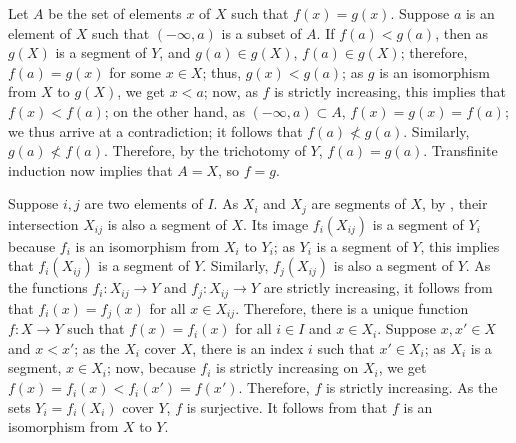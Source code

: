 \documentclass{article}
\begin{document}
\begin{solution}[\ref{exe:owfnmkbo}]
  \label{sol:wcch8wta}
  Let \(A\) be the set of elements \(x\) of \(X\) such that
  \(f(x) = g(x)\).  Suppose \(a\) is an element of \(X\) such that
  \((-\infty, a)\) is a subset of \(A\).  If \(f(a) < g(a)\), then as
  \(g(X)\) is a segment of \(Y\), and \(g(a) \in g(X)\),
  \(f(a) \in g(X)\); therefore, \(f(a) = g(x)\) for some \(x \in X\);
  thus, \(g(x) < g(a)\); as \(g\) is an isomorphism from \(X\) to
  \(g(X)\), we get \(x < a\); now, as \(f\) is strictly increasing,
  this implies that \(f(x) < f(a)\); on the other hand, as
  \((-\infty, a) \subset A\), \(f(x) = g(x) = f(a)\); we thus arrive
  at a contradiction; it follows that \(f(a) \nless g(a)\).
  Similarly, \(g(a) \nless f(a)\).  Therefore, by the trichotomy of
  \(Y\), \(f(a) = g(a)\).  Transfinite induction 
  now implies that \(A = X\), so \(f = g\).
\end{solution}

\begin{solution}[\ref{exe:mybmksm1}]
  \label{sol:yxq37p1c}
  Suppose \(i,j\) are two elements of \(I\).  As \(X_i\) and \(X_j\)
  are segments of \(X\), by , their intersection
  \(X_{ij}\) is also a segment of \(X\).  Its image \(f_i(X_{ij})\) is
  a segment of \(Y_i\) because \(f_i\) is an isomorphism from \(X_i\)
  to \(Y_i\); as \(Y_i\) is a segment of \(Y\), this implies that
  \(f_i(X_{ij})\) is a segment of \(Y\).  Similarly, \(f_j(X_{ij})\)
  is also a segment of \(Y\).  As the functions \(f_i : X_{ij} \to Y\)
  and \(f_j : X_{ij} \to Y\) are strictly increasing, it follows from
   that \(f_i(x) = f_j(x)\) for all
  \(x \in X_{ij}\).  Therefore, there is a unique function
  \(f : X \to Y\) such that \(f(x) = f_i(x)\) for all \(i \in I\) and
  \(x \in X_i\).  Suppose \(x, x' \in X\) and \(x < x'\); as the
  \(X_i\) cover \(X\), there is an index \(i\) such that
  \(x' \in X_i\); as \(X_i\) is a segment, \(x \in X_i\); now, because
  \(f_i\) is strictly increasing on \(X_i\), we get
  \(f(x) = f_i(x) < f_i(x') = f(x')\).  Therefore, \(f\) is strictly
  increasing.  As the sets \(Y_i = f_i(X_i)\) cover \(Y\), \(f\) is
  surjective.  It follows from  that \(f\) is an
  isomorphism from \(X\) to \(Y\).
\end{solution}
\end{document}
